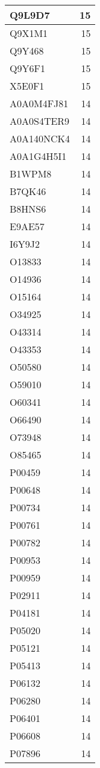 \documentclass[
]{book}
\theoremstyle{definition}
\theoremstyle{definition}
\theoremstyle{definition}
\theoremstyle{definition}
\theoremstyle{remark}
\begin{document}
\begin{table}
\begin{tabular}{l|r}
\hline
Q9L9D7 & 15\\
\hline
Q9X1M1 & 15\\
\hline
Q9Y468 & 15\\
\hline
Q9Y6F1 & 15\\
\hline
X5E0F1 & 15\\
\hline
A0A0M4FJ81 & 14\\
\hline
A0A0S4TER9 & 14\\
\hline
A0A140NCK4 & 14\\
\hline
A0A1G4H5I1 & 14\\
\hline
B1WPM8 & 14\\
\hline
B7QK46 & 14\\
\hline
B8HNS6 & 14\\
\hline
E9AE57 & 14\\
\hline
I6Y9J2 & 14\\
\hline
O13833 & 14\\
\hline
O14936 & 14\\
\hline
O15164 & 14\\
\hline
O34925 & 14\\
\hline
O43314 & 14\\
\hline
O43353 & 14\\
\hline
O50580 & 14\\
\hline
O59010 & 14\\
\hline
O60341 & 14\\
\hline
O66490 & 14\\
\hline
O73948 & 14\\
\hline
O85465 & 14\\
\hline
P00459 & 14\\
\hline
P00648 & 14\\
\hline
P00734 & 14\\
\hline
P00761 & 14\\
\hline
P00782 & 14\\
\hline
P00953 & 14\\
\hline
P00959 & 14\\
\hline
P02911 & 14\\
\hline
P04181 & 14\\
\hline
P05020 & 14\\
\hline
P05121 & 14\\
\hline
P05413 & 14\\
\hline
P06132 & 14\\
\hline
P06280 & 14\\
\hline
P06401 & 14\\
\hline
P06608 & 14\\
\hline
P07896 & 14\\

\end{tabular}
\end{table}
\end{document}
